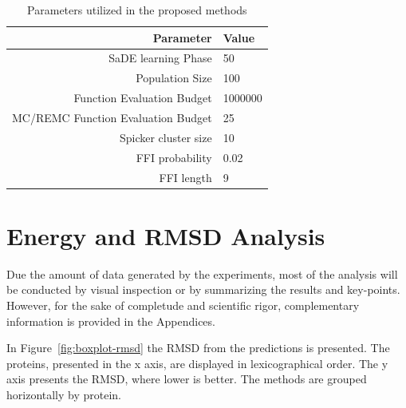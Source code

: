 \begin{table}[ht]
    \centering
    \begin{tabular}{r|l} \hline \hline
        Parameter & Value \\ \hline \hline
        SaDE learning Phase & 50 \\ \hline
        Population Size & 100 \\ \hline
        Function Evaluation Budget & 1000000 \\ \hline
        MC/REMC Function Evaluation Budget & 25 \\ \hline
        Spicker cluster size & 10 \\ \hline
        \ac{FFI} probability & 0.02 \\ \hline
        \ac{FFI} length & 9 \\ \hline \hline
    \end{tabular}
    \caption{Parameters utilized in the proposed methods}
    \label{tab:parameters}
\end{table}

\section{Energy and \ac{RMSD} Analysis}\label{sec:methods-analysis}



Due the amount of data generated by the experiments, most of the analysis will
be conducted by visual inspection or by summarizing the results and key-points.
However, for the sake of completude and scientific rigor, complementary
information is provided in the Appendices.

In Figure~\ref{fig:boxplot-rmsd} the RMSD from the predictions is presented.
The proteins, presented in the x axis, are displayed in lexicographical order.
The y axis presents the RMSD, where lower is better. The methods are grouped
horizontally by protein.

